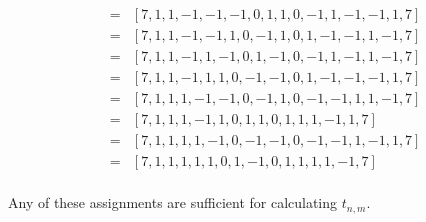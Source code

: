 \documentclass[12pt]{article}
\theoremstyle{plain}
\theoremstyle{definition}
\theoremstyle{remark}
\theoremstyle{definition}
\begin{document}
\begin{eqnarray*}
    & = & [7, 1, 1, -1, -1, -1, 0, 1, 1, 0, -1, 1, -1, -1, 1, 7] \\
    & = & [7, 1, 1, -1, -1, 1, 0, -1, 1, 0, 1, -1, -1, 1, -1, 7] \\
    & = & [7, 1, 1, -1, 1, -1, 0, 1, -1, 0, -1, 1, -1, 1, -1, 7] \\
    & = & [7, 1, 1, -1, 1, 1, 0, -1, -1, 0, 1, -1, -1, -1, 1, 7] \\
    & = & [7, 1, 1, 1, -1, -1, 0, -1, 1, 0, -1, -1, 1, 1, -1, 7] \\
    & = & [7, 1, 1, 1, -1, 1, 0, 1, 1, 0, 1, 1, 1, -1, 1, 7] \\
    & = & [7, 1, 1, 1, 1, -1, 0, -1, -1, 0, -1, -1, 1, -1, 1, 7] \\
    & = & [7, 1, 1, 1, 1, 1, 0, 1, -1, 0, 1, 1, 1, 1, -1, 7] \\
\end{eqnarray*}

Any of these assignments are sufficient for calculating $t_{n,m}$. 


\printbibheading

\printbibliography
\end{document}
